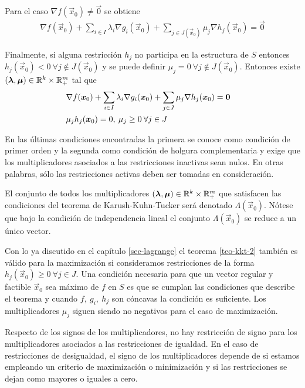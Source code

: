 \begin{demostracion}
Para el caso $\nabla f(\vec{x}_0) \neq \vec{0}$ se obtiene
\begin{gather}\label{cpo-kkt}
\nabla f(\vec{x}_0) + \sum_{i\in I} \lambda_i \nabla g_i(\vec{x}_0) + \sum_{j\in J(\vec{x}_0)} \mu_j \nabla h_j(\vec{x}_0) = \vec{0} \tag{*}
\end{gather}

Finalmente, si alguna restricci\'on $h_j$ no participa en la estructura de $S$ entonces $h_j(\vec{x}_0)<0 \:\forall j\notin J(\vec{x}_0)$ y se puede definir $\mu_j = 0 \:\forall j\notin J(\vec{x}_0)$.  Entonces existe $(\vec{\lambda},\vec{\mu}) \in \R^k\times \R^m_+$ tal que
\begin{align*}
&\nabla f(\vec{x}_0) + \sum_{i\in I} \lambda_i \nabla g_i (\vec{x}_0) + \sum_{j\in J} \mu_j \nabla h_j (\vec{x}_0) = \vec{0} \cr
&\mu_j h_j (\vec{x}_0) = 0,\: \mu_j \geq 0 \: \forall j\in J
\end{align*}
\end{demostracion}

En las \'ultimas condiciones encontradas la primera se conoce como condici\'on de primer orden y la segunda como condici\'on de holgura complementaria y exige que los multiplicadores asociados a las restricciones inactivas sean nulos. En otras palabras, s\'olo las restricciones activas deben ser tomadas en consideraci\'on. 

\begin{definicion}
El conjunto de todos los multiplicadores $(\vec{\lambda},\vec{\mu})\in \R^k\times \R^m_+$ que satisfacen las condiciones del teorema de Karush-Kuhn-Tucker ser\'a denotado $\Lambda(\vec{x}_0)$. N\'otese que bajo la condici\'on de independencia lineal el conjunto $\Lambda(\vec{x}_0)$ se reduce a un \'unico vector.
\end{definicion}

Con lo ya discutido en el cap\'itulo \ref{sec-lagrange} el teorema \ref{teo-kkt-2} tambi\'en es v\'alido para la maximizaci\'on si consideramos restricciones de la forma $h_j(\vec{x}_0) \geq  0 \:\forall j\in J$.  Una condici\'on necesaria para que un vector regular y factible $\vec{x}_0$ sea m\'aximo de $f$ en $S$ es que se cumplan las condiciones que describe el teorema  y cuando $f,\:g_i,\:h_j$ son  c\'oncavas la condici\'on es suficiente. Los multiplicadores $\mu_j$ siguen siendo no negativos para el caso de maximizaci\'on.

Respecto de los signos de los multiplicadores, no hay restricci\'on de signo para los multiplicadores asociados a las restricciones de igualdad. En el caso de restricciones de desigualdad, el signo de los multiplicadores depende de si estamos empleando un criterio de maximizaci\'on o minimizaci\'on y si las restricciones se dejan como mayores o iguales a cero. 

